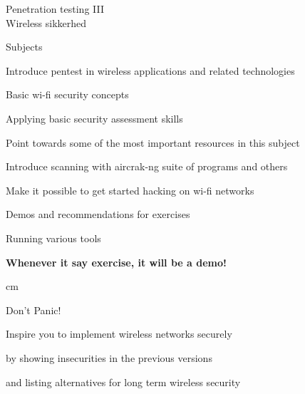 \documentclass[Screen16to9,17pt]{foils}
\begin{document}

\mytitlepage
{Penetration testing III\\ Wireless sikkerhed}


\LogoOn



\begin{list1}
\item Subjects
\begin{list2}
\item Introduce pentest in wireless applications and related technologies
\item Basic wi-fi security concepts
\item Applying basic security assessment skills
\item Point towards some of the most important resources in this subject
\item Introduce scanning with aircrak-ng suite of programs and others
\item Make it possible to get started hacking on wi-fi networks
\end{list2}
\item Demos and recommendations for exercises
\begin{list2}
\item Running various tools
\end{list2}
\end{list1}

{\bf Whenever it say exercise, it will be a demo!}

 cm

\centerline{\color{titlecolor}\LARGE Don't Panic!}


\begin{list1}
\item Inspire you to implement wireless networks securely

\item by showing insecurities in the previous versions

\item and listing alternatives for long term wireless security
\end{list1}
\end{document}
